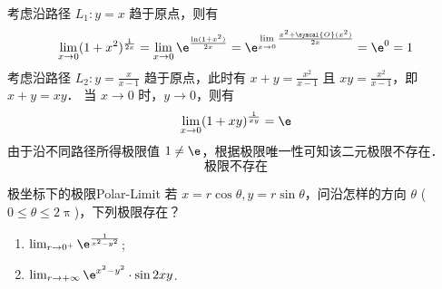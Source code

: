 \begin{solution}
    考虑沿路径 $L_1: y = x$ 趋于原点，则有
    \begin{equation}
        \lim_{x \to 0} (1 + x^2)^{\frac{1}{2x}} = \lim_{x \to 0} \e^{\frac{\ln(1 + x^2)}{2x}} = \e^{\lim\limits_{x \to 0} \frac{x^2 + \symcal{O}(x^2)}{2x}} = \e^0 = 1
    \end{equation}
    考虑沿路径 $L_2: y = \frac{x}{x - 1}$ 趋于原点，此时有 $x + y = \frac{x^2}{x - 1}$ 且 $xy = \frac{x^2}{x - 1}$，即 $x + y = xy$．
    当 $x \to 0$ 时，$y \to 0$，则有
    \begin{equation}
        \lim_{x \to 0} (1 + xy)^{\frac{1}{xy}} = \e
    \end{equation}
    由于沿不同路径所得极限值 $1 \neq \e$，根据极限唯一性可知该二元极限不存在．
    \begin{equation}
        \boxed{\text{极限不存在}}
    \end{equation}
\end{solution}


\begin{problem}{极坐标下的极限}{Polar-Limit}
    若 $x = r \cos \theta, y = r \sin \theta$，问沿怎样的方向 $\theta$ ($0 \leqslant \theta \leqslant 2\uppi$)，下列极限存在？
    \begin{enumerate}
        \item $ \lim_{r \to 0^+} \e^{\frac{1}{x^2 - y^2}}$;
        \item $ \lim_{r \to +\infty} \e^{x^2 - y^2} \cdot \sin 2xy$.
    \end{enumerate}
\end{problem}

